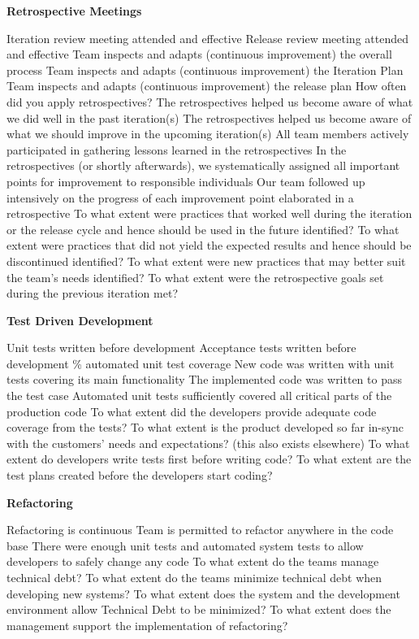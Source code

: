 \textbf{Retrospective Meetings}
\begin{itemize}
	\taa Iteration review meeting attended and effective
	\taa Release review meeting attended and effective
	\taar Team inspects and adapts (continuous improvement) the overall process
	\taar Team inspects and adapts (continuous improvement) the Iteration Plan
	\taar Team inspects and adapts (continuous improvement) the release plan
	\pamr How often did you apply retrospectives? %
	\pamr The retrospectives helped us become aware of what we did well in the past iteration(s)
	\pamr The retrospectives helped us become aware of what we should improve in the upcoming iteration(s)
	\pamr All team members actively participated in gathering lessons learned in the retrospectives
	\pamr In the retrospectives (or shortly afterwards), we systematically assigned all important points for improvement to responsible individuals
	\pamr Our team followed up intensively on the progress of each improvement point elaborated in a retrospective
	\ops To what extent were practices that worked well during the iteration or the release cycle and hence should be used in the future identified?
	\ops To what extent were practices that did not yield the expected results and hence should be discontinued identified?
	\ops To what extent were new practices that may better suit the team's needs identified?
	\ops To what extent were the retrospective goals set during the previous iteration met? 
\end{itemize}

\textbf{Test Driven Development}
\begin{itemize}
	\taa Unit tests written before development
	\taar Acceptance tests written before development
	\% automated unit test coverage
	\pam New code was written with unit tests covering its main functionality
	\pam The implemented code was written to pass the test case
	\pamr Automated unit tests sufficiently covered all critical parts of the production code
	\ops To what extent did the developers provide adequate code coverage from the tests?
	\ops To what extent is the product developed so far in-sync with the customers' needs and expectations? (this also exists elsewhere)
	\ops To what extent do developers write tests first before writing code?
	\ops To what extent are the test plans created before the developers start coding? 
\end{itemize}

\textbf{Refactoring}
\begin{itemize}
	\taa Refactoring is continuous
	\pamr Team is permitted to refactor anywhere in the code base
	\pamr There were enough unit tests and automated system tests to allow developers to safely change any code
	\ops To what extent do the teams manage technical debt? 
	\ops To what extent do the teams minimize technical debt when developing new systems? 
	\ops To what extent does the system and the development environment allow Technical Debt to be minimized? 
	\ops To what extent does the management support the implementation of refactoring? 
\end{itemize}

